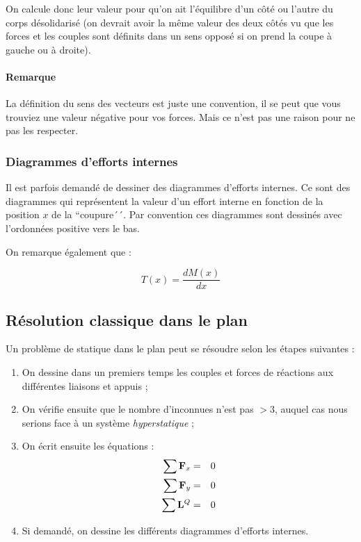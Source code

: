 On calcule donc leur valeur pour qu'on ait l'équilibre d'un côté ou l'autre du corps désolidarisé (on devrait avoir la même valeur des deux côtés vu que les forces et les couples sont définits dans un sens opposé si on prend la coupe à gauche ou à droite).

\paragraph{Remarque}
La définition du sens des vecteurs est juste une convention, il se peut que vous trouviez une valeur négative pour vos forces.
Mais ce n'est pas une raison pour ne pas les respecter.

\subsubsection{Diagrammes d'efforts internes}
Il est parfois demandé de dessiner des diagrammes d'efforts internes. Ce sont des diagrammes qui représentent
la valeur d'un effort interne en fonction de la position $x$ de la ``coupure´´. Par convention ces diagrammes
sont dessinés avec l'ordonnées positive vers le bas.

On remarque également que :

$$T(x) = \frac{dM(x)}{dx}$$

\subsection{Résolution classique dans le plan}
Un problème de statique dans le plan peut se résoudre selon les étapes suivantes :

\begin{enumerate}
	\item On dessine dans un premiers temps les couples et forces de réactions aux différentes liaisons et appuis ;
	\item On vérifie ensuite que le nombre d'inconnues n'est pas $> 3$, auquel cas nous serions face à un système \textit{hyperstatique} ;
	\item On écrit ensuite les équations :
				\begin{eqnarray*}
					\sum {\bf F}_x &=& 0 \\
					\sum {\bf F}_y &=& 0 \\
					\sum {\bf L}^Q 		&=& 0
				\end{eqnarray*}
	\item Si demandé, on dessine les différents diagrammes d'efforts internes.
\end{enumerate}


